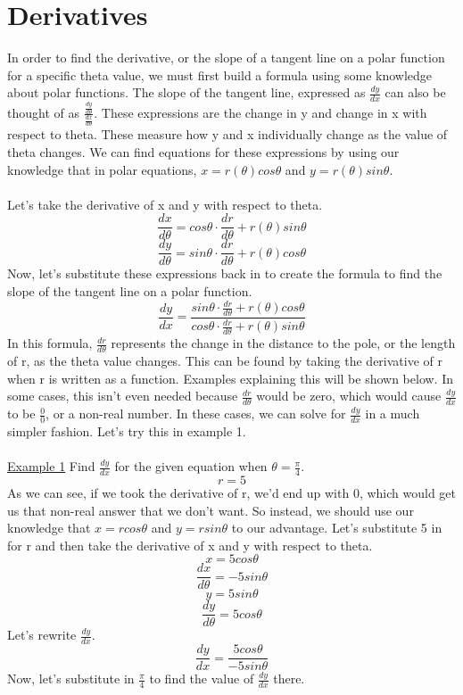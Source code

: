 \documentclass[a4paper,openright, 14pt]{article}
\begin{document}
\section*{Derivatives}
In order to find the derivative, or the slope of a tangent line on a polar function for a specific theta value, we must first build a formula using some knowledge about polar functions. The slope of the tangent line, expressed as $\frac{dy}{dx}$ can also be thought of as $\frac{\frac{dy}{d\theta}}{\frac{dx}{d\theta}}$. These expressions are the change in y and change in x with respect to theta. These measure how y and x individually change as the value of theta changes. We can find equations for these expressions by using our knowledge that in polar equations, $x=r(\theta)cos\theta$ and $y=r(\theta)sin\theta$.\\\\
Let’s take the derivative of x and y with respect to theta.
$$\frac{dx}{d\theta}=cos\theta \cdot \frac{dr}{d\theta}+r(\theta)sin\theta$$
$$\frac{dy}{d\theta}=sin\theta \cdot \frac{dr}{d\theta}+r(\theta)cos\theta$$
Now, let’s substitute these expressions back in to create the formula to find the slope of the tangent line on a polar function.
$$\frac{dy}{dx}=\frac{sin\theta \cdot \frac{dr}{d\theta}+r(\theta)cos\theta}{cos\theta \cdot \frac{dr}{d\theta}+r(\theta)sin\theta}$$
In this formula, $\frac{dr}{d\theta}$ represents the change in the distance to the pole, or the length of r, as the theta value changes. This can be found by taking the derivative of r when r is written as a function. Examples explaining this will be shown below. In some cases, this isn’t even needed because $\frac{dr}{d\theta}$ would be zero, which would cause $\frac{dy}{dx}$ to be $\frac{0}{0}$, or a non-real number. In these cases, we can solve for $\frac{dy}{dx}$ in a much simpler fashion. Let’s try this in example 1.\\\\
\underline{Example 1}
Find $\frac{dy}{dx}$ for the given equation when $\theta=\frac{\pi}{4}$.
$$r=5$$
As we can see, if we took the derivative of r, we’d end up with 0, which would get us that non-real answer that we don’t want. So instead, we should use our knowledge that $x=rcos\theta$ and $y=rsin\theta$ to our advantage. Let’s substitute 5 in for r and then take the derivative of x and y with respect to theta.
$$x=5cos\theta$$
$$\frac{dx}{d\theta}=-5sin\theta$$
$$y=5sin\theta$$
$$\frac{dy}{d\theta}=5cos\theta$$
Let’s rewrite $\frac{dy}{dx}$.
$$\frac{dy}{dx}=\frac{5cos\theta}{-5sin\theta}$$
Now, let’s substitute in $\frac{\pi}{4}$ to find the value of $\frac{dy}{dx}$ there. 
\end{document}
